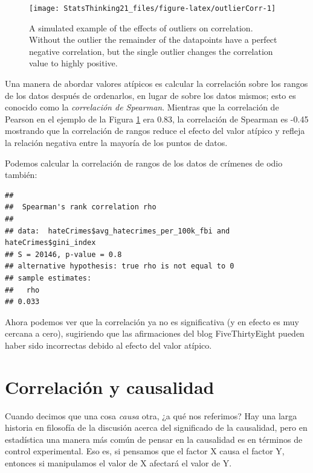\documentclass[
  12pt,
]{book}
\begin{document}
\begin{figure}
\texttt{[image: StatsThinking21\_files/figure-latex/outlierCorr-1]} \caption{A simulated example of the effects of outliers on correlation.  Without the outlier the remainder of the datapoints have a perfect negative correlation, but the single outlier changes the correlation value to highly positive.}\label{fig:outlierCorr}
\end{figure}

Una manera de abordar valores atípicos es calcular la correlación sobre los rangos de los datos después de ordenarlos, en lugar de sobre los datos mismos; esto es conocido como la \emph{correlación de Spearman}. Mientras que la correlación de Pearson en el ejemplo de la Figura \ref{fig:outlierCorr} era 0.83, la correlación de Spearman es -0.45 mostrando que la correlación de rangos reduce el efecto del valor atípico y refleja la relación negativa entre la mayoría de los puntos de datos.

Podemos calcular la correlación de rangos de los datos de crímenes de odio también:

\begin{verbatim}
## 
##  Spearman's rank correlation rho
## 
## data:  hateCrimes$avg_hatecrimes_per_100k_fbi and hateCrimes$gini_index
## S = 20146, p-value = 0.8
## alternative hypothesis: true rho is not equal to 0
## sample estimates:
##   rho 
## 0.033
\end{verbatim}

Ahora podemos ver que la correlación ya no es significativa (y en efecto es muy cercana a cero), sugiriendo que las afirmaciones del blog FiveThirtyEight pueden haber sido incorrectas debido al efecto del valor atípico.

\hypertarget{correlaciuxf3n-y-causalidad}{%
\section{Correlación y causalidad}\label{correlaciuxf3n-y-causalidad}}

Cuando decimos que una cosa \emph{causa} otra, ¿a qué nos referimos? Hay una larga historia en filosofía de la discusión acerca del significado de la causalidad, pero en estadística una manera más común de pensar en la causalidad es en términos de control experimental. Eso es, si pensamos que el factor X causa el factor Y, entonces si manipulamos el valor de X afectará el valor de Y.
\end{document}
